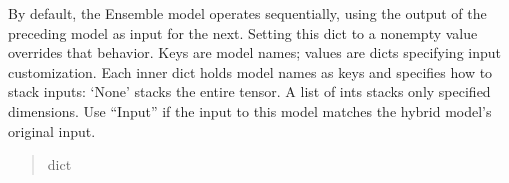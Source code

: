\documentclass[letterpaper,10pt,english]{sphinxmanual}
\begin{document}
\begin{fulllineitems}
\begin{fulllineitems}
\end{fulllineitems}


\begin{fulllineitems}
\label{\detokenize{index:hypyml.configs.HybridConfig.model_inputs}}
\pysigstartsignatures
{}
\pysigstopsignatures
\sphinxAtStartPar
By default, the Ensemble model operates sequentially, using the output of the preceding model as input for the next.
Setting this dict to a non\sphinxhyphen{}empty value overrides that behavior.
Keys are model names; values are dicts specifying input customization.
Each inner dict holds model names as keys and specifies how to stack inputs:
\sphinxhyphen{} ‘None’ stacks the entire tensor.
\sphinxhyphen{} A list of ints stacks only specified dimensions.
Use “Input” if the input to this model matches the hybrid model’s original input.
\begin{quote}\begin{description}
\sphinxAtStartPar
dict

\end{description}\end{quote}

\end{fulllineitems}


\end{fulllineitems}

\end{document}
